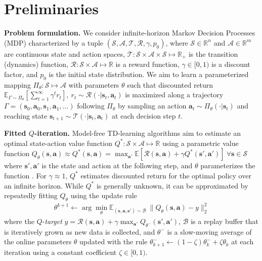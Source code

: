\documentclass{article}
\begin{document}
\section{Preliminaries}
\label{sec:preliminaries}
\textbf{Problem formulation.} We consider infinite-horizon Markov Decision Processes (MDP) characterized by a tuple $(\mathcal{S}, \mathcal{A}, \mathcal{T}, \mathcal{R}, \gamma, p_{0})$, where $\mathcal{S} \in \mathbb{R}^{n}$ and $\mathcal{A} \in \mathbb{R}^{m}$ are continuous state and action spaces, $\mathcal{T} \colon \mathcal{S} \times \mathcal{A} \times \mathcal{S} \mapsto \mathbb{R}_{+}$ is the transition (dynamics) function, $\mathcal{R} \colon \mathcal{S} \times \mathcal{A} \mapsto \mathbb{R}$ is a reward function, $\gamma \in [0,1)$ is a discount factor, and $p_{0}$ is the initial state distribution. We aim to learn a parameterized mapping $\Pi_{\theta} \colon \mathcal{S} \mapsto \mathcal{A}$ with parameters $\theta$ such that discounted return $\mathbb{E}_{\Gamma \sim \Pi_{\theta}} [ \sum^{\infty}_{t=1} \gamma^{t} r_{t} ],~r_{t} \sim \mathcal{R}(\cdot | \mathbf{s}_{t}, \mathbf{a}_{t})$ is maximized along a trajectory $\Gamma = (\mathbf{s}_{0}, \mathbf{a}_{0}, \mathbf{s}_{1}, \mathbf{a}_{1},\dots)$ following $\Pi_{\theta}$ by sampling an action $\mathbf{a}_{t} \sim \Pi_{\theta}(\cdot | \mathbf{s}_{t})$ and reaching state $\mathbf{s}_{t+1} \sim \mathcal{T}(\cdot | \mathbf{s}_{t}, \mathbf{a}_{t})$ at each decision step $t$.

\textbf{Fitted $Q$-iteration.} Model-free TD-learning algorithms aim to estimate an optimal state-action value function $Q^{*} \colon \mathcal{S} \times \mathcal{A} \mapsto \mathbb{R}$ using a parametric value function $Q_{\theta}(\mathbf{s}, \mathbf{a}) \approx Q^{*}(\mathbf{s}, \mathbf{a}) = \max_{\mathbf{a}'} \mathbb{E}[ \mathcal{R}(\mathbf{s}, \mathbf{a}) + \gamma Q^{*}(\mathbf{s}', \mathbf{a}')]~\forall \mathbf{s} \in \mathcal{S}$ where $\mathbf{s}', \mathbf{a}'$ is the state and action at the following step, and $\theta$ parameterizes the function \citep{Sutton1988LearningTP}. For $\gamma \approx 1$, $Q^{*}$ estimates discounted return for the optimal policy over an infinite horizon. While $Q^{*}$ is generally unknown, it can be approximated by repeatedly fitting $Q_{\theta}$ using the update rule
\begin{align}
    \label{eq:fitted-value-iteration}
    \theta^{k+1} \leftarrow \arg\min_{\theta} \mathbb{E}_{(\mathbf{s}, \mathbf{a}, \mathbf{s}') \sim \mathcal{B}}~\| Q_{\theta}(\mathbf{s}, \mathbf{a}) - y \|_{2}^{2}
\end{align}
where the $Q$-\textit{target} $y =  \mathcal{R}(\mathbf{s}, \mathbf{a}) + \gamma \max_{\mathbf{a}'} Q_{\theta^{-}}(\mathbf{s}', \mathbf{a}')$, $\mathcal{B}$ is a replay buffer that is iteratively grown as new data is collected, and $\theta^{-}$ is a slow-moving average of the online parameters $\theta$ updated with the rule $\theta^{-}_{k+1} \longleftarrow (1 - \zeta) \theta^{-}_{k} + \zeta \theta_{k}
$ at each iteration using a constant coefficient $\zeta \in [0, 1)$.
\end{document}
